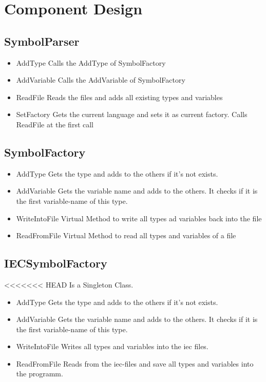 	
\section{Component Design}
\subsection{SymbolParser}
\begin{itemize}
	\item AddType
	\subitem Calls the AddType of SymbolFactory
	\item AddVariable
	\subitem Calls the AddVariable of SymbolFactory
	\item ReadFile
	\subitem Reads the files and adds all existing types and variables
	\item SetFactory
	 \subitem Gets the current language and sets it as current factory. Calls ReadFile at the first call
\end{itemize}



\subsection{SymbolFactory}
\begin{itemize}
	\item AddType
	\subitem Gets the type and adds to the others if it's not exists.
	\item AddVariable
	\subitem Gets the variable name and adds to the others. It checks if it is the first variable-name of this type.
	\item WriteIntoFile
	\subitem Virtual Method to write all types ad variables back into the file
	\item ReadFromFile
	 \subitem Virtual Method to read all types and variables of a file
\end{itemize}

\subsection{IECSymbolFactory}
<<<<<<< HEAD
Is a Singleton Class.
\begin{itemize}
	\item AddType
	\subitem Gets the type and adds to the others if it's not exists.
	\item AddVariable
	\subitem Gets the variable name and adds to the others. It checks if it is the first variable-name of this type.
	\item WriteIntoFile
	\subitem Writes all types and variables into the iec files.
	\item ReadFromFile
	 \subitem Reads from the iec-files and save all types and variables into the programm.
\end{itemize}

